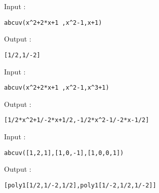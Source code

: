 \documentclass[a4paper,11pt]{book}
\begin{document}
Input :
\begin{center}{\tt abcuv(x\verb|^|2+2*x+1 ,x\verb|^|2-1,x+1)}\end{center}
Output :
\begin{center}{\tt [1/2,1/-2]}\end{center}
Input :
\begin{center}{\tt abcuv(x\verb|^|2+2*x+1 ,x\verb|^|2-1,x\verb|^|3+1)}\end{center}
Output :
\begin{center}{\tt [1/2*x\verb|^|2+1/-2*x+1/2,-1/2*x\verb|^|2-1/-2*x-1/2]}\end{center}
Input :
\begin{center}{\tt abcuv([1,2,1],[1,0,-1],[1,0,0,1])}\end{center}
Output :
\begin{center}{\tt [poly1[1/2,1/-2,1/2],poly1[1/-2,1/2,1/-2]]}\end{center}

% 
\end{document}
